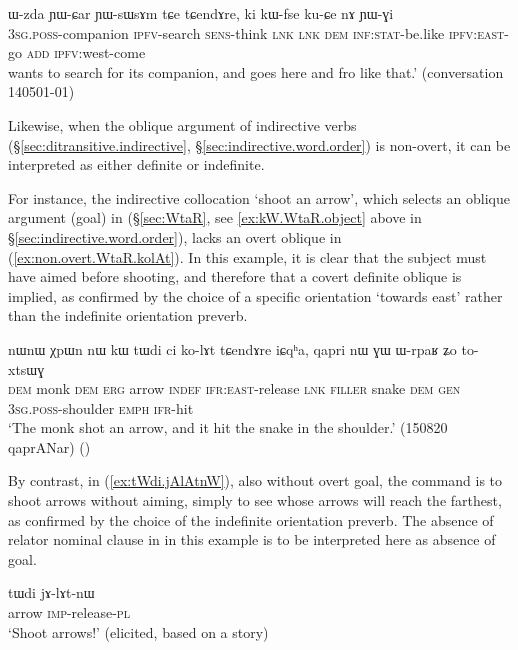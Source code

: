 \begin{exe}
\ex \label{ex:kuCe.nA.YWGi2}
\gll ɯ-zda ɲɯ-ɕar ɲɯ-sɯsɤm  tɕe tɕendɤre, ki kɯ-fse ku-ɕe nɤ ɲɯ-ɣi \\
\textsc{3sg}.\textsc{poss}-companion \textsc{ipfv}-search \textsc{sens}-think \textsc{lnk} \textsc{lnk} \textsc{dem} \textsc{inf}:\textsc{stat}-be.like \textsc{ipfv}:\textsc{east}-go \textsc{add} \textsc{ipfv}:west-come \\
 wants to search for its companion, and goes here and fro like that.' (conversation 140501-01)
\end{exe}

Likewise, when the oblique argument of indirective verbs (§\ref{sec:ditransitive.indirective}, §\ref{sec:indirective.word.order}) is non-overt, it can be interpreted as either definite or indefinite.

For instance, the indirective collocation  `shoot an arrow', which selects an oblique argument (goal) in  (§\ref{sec:WtaR}, see \ref{ex:kW.WtaR.object} above in §\ref{sec:indirective.word.order}), lacks an overt oblique in (\ref{ex:non.overt.WtaR.kolAt}). In this example, it is clear that the subject must have aimed before shooting, and therefore that a covert definite oblique is implied, as confirmed by the choice of a specific orientation `towards east' rather than the indefinite orientation preverb.

\begin{exe}
\ex \label{ex:non.overt.WtaR.kolAt}
\gll  nɯnɯ χpɯn nɯ kɯ tɯdi ci ko-lɤt tɕendɤre iɕqʰa,  qapri nɯ ɣɯ ɯ-rpaʁ ʑo to-xtsɯɣ \\
\textsc{dem} monk \textsc{dem} \textsc{erg} arrow \textsc{indef} \textsc{ifr}:\textsc{east}-release \textsc{lnk} \textsc{filler} snake \textsc{dem} \textsc{gen} \textsc{3sg}.\textsc{poss}-shoulder \textsc{emph} \textsc{ifr}-hit \\
\glt `The monk shot an arrow, and it hit the snake in the shoulder.' (150820 qaprANar)
()
\end{exe}

By contrast, in (\ref{ex:tWdi.jAlAtnW}), also without overt goal, the command is to shoot arrows without aiming, simply to see whose arrows will reach the farthest, as confirmed by the choice of the indefinite orientation preverb. The absence of relator nominal clause in  in this example is to be interpreted here as absence of goal.

\begin{exe}
\ex \label{ex:tWdi.jAlAtnW}
\gll  tɯdi jɤ-lɤt-nɯ \\
arrow \textsc{imp}-release-\textsc{pl} \\
\glt `Shoot arrows!' (elicited, based on a story)
\end{exe}


